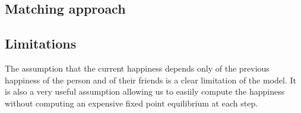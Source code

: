 \documentclass[11pt]{article}
\begin{document}
\subsection{Matching approach}



\subsection{Limitations}

The assumption that the current happiness depends only of the previous happiness of the person and of their friends is a clear limitation of the model. It is also a very useful assumption allowing us to easiily compute the happiness without computing an expensive fixed point equilibrium at each step. 




\end{document}
